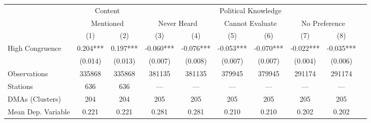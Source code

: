 {\def \sym#1{\ifmmode^{#1}\else\(^{#1}\)\fi} \begin{tabular}{l*{9}{c}} \toprule  \ & \multicolumn{2}{c}{Content} & \multicolumn{6}{c}{Political Knowledge} \\\cmidrule(lr){2-3} \cmidrule(lr){4-9}
                &\multicolumn{2}{c}{Mentioned}&\multicolumn{2}{c}{Never Heard}&\multicolumn{2}{c}{Cannot Evaluate}&\multicolumn{2}{c}{No Preference}\\\cmidrule(lr){2-3}\cmidrule(lr){4-5}\cmidrule(lr){6-7}\cmidrule(lr){8-9}
                &\multicolumn{1}{c}{(1)}   &\multicolumn{1}{c}{(2)}   &\multicolumn{1}{c}{(3)}   &\multicolumn{1}{c}{(4)}   &\multicolumn{1}{c}{(5)}   &\multicolumn{1}{c}{(6)}   &\multicolumn{1}{c}{(7)}   &\multicolumn{1}{c}{(8)}   \\
\midrule
High Congruence &    0.204***&    0.197***&   -0.060***&   -0.076***&   -0.053***&   -0.070***&   -0.022***&   -0.035***\\
                &  (0.014)   &  (0.013)   &  (0.007)   &  (0.008)   &  (0.007)   &  (0.007)   &  (0.004)   &  (0.006)   \\
\midrule
Observations    &   335868   &   335868   &   381135   &   381135   &   379945   &   379945   &   291174   &   291174   \\
Stations        &      636   &      636   &      ---   &      ---   &      ---   &      ---   &      ---   &      ---   \\
DMAs (Clusters) &      204   &      204   &      205   &      205   &      205   &      205   &      205   &      205   \\
Mean Dep. Variable&    0.221   &    0.221   &    0.281   &    0.281   &    0.210   &    0.210   &    0.202   &    0.202   \\
\bottomrule
\end{tabular}
}
